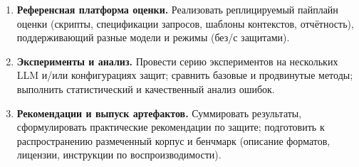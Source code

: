 \begin{enumerate}
  \item \textbf{Референсная платформа оценки.}
    Реализовать реплицируемый пайплайн оценки (скрипты, спецификации запросов, шаблоны контекстов, отчётность), поддерживающий разные модели и режимы (без/с защитами).
  \item \textbf{Эксперименты и анализ.}
    Провести серию экспериментов на нескольких LLM и/или конфигурациях защит; сравнить базовые и продвинутые методы; выполнить статистический и качественный анализ ошибок.
  \item \textbf{Рекомендации и выпуск артефактов.}
    Суммировать результаты, сформулировать практические рекомендации по защите; подготовить к распространению размеченный корпус и бенчмарк (описание форматов, лицензии, инструкции по воспроизводимости).
\end{enumerate}
